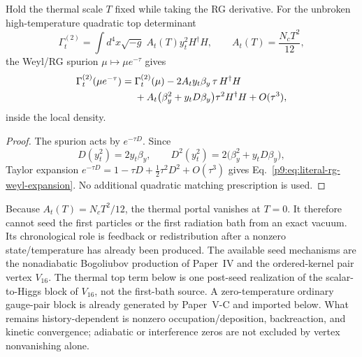 \documentclass[12pt,a4paper]{article}
\begin{document}
\begin{lemma}
\label{p9:lem:two-higgs-anomaly-matching}
Hold the thermal scale \(T\) fixed while taking the RG derivative.  For the
unbroken high-temperature quadratic top determinant
\begin{equation}
\label{p9:eq:top-thermal-det-quadratic}
\Gamma_t^{(2)}
=\int d^4x\sqrt{-g}\;A_t(T)y_t^2H^\dagger H,
\qquad A_t(T)=\frac{N_cT^2}{12},
\end{equation}
the Weyl/RG spurion \(\mu\mapsto\mu e^{-\tau}\) gives
\begin{align}
\Gamma_t^{(2)}(\mu e^{-\tau})
={}&\Gamma_t^{(2)}(\mu)
-2A_t y_t\beta_y\,\tau\,H^\dagger H \notag\\
&+A_t\bigl(\beta_y^2+y_tD\beta_y\bigr)\tau^2H^\dagger H
+O(\tau^3),
\label{p9:eq:literal-rg-weyl-expansion}
\end{align}
inside the local density.
\end{lemma}

\begin{proof}
The spurion acts by \(e^{-\tau D}\).  Since
\[
D(y_t^2)=2y_t\beta_y,
\qquad
D^2(y_t^2)=2\bigl(\beta_y^2+y_tD\beta_y\bigr),
\]
Taylor expansion
\(e^{-\tau D}=1-\tau D+\tfrac12\tau^2D^2+O(\tau^3)\)
gives Eq.~\eqref{p9:eq:literal-rg-weyl-expansion}.  No additional quadratic
matching prescription is used.
\end{proof}

\begin{remark}
\label{p9:rem:thermal-portal-chronology}
Because \(A_t(T)=N_cT^2/12\), the thermal portal vanishes at \(T=0\).  It
therefore cannot seed the first particles or the first radiation bath from an
exact vacuum.  Its chronological role is feedback or redistribution after a
nonzero state/temperature has already been produced.  The available seed
mechanisms are the nonadiabatic Bogoliubov production of Paper~IV and the
ordered-kernel pair vertex \(V_{16}\).  The thermal top term below is one
post-seed realization of the scalar-to-Higgs block of \(V_{16}\), not the
first-bath source.  A zero-temperature ordinary gauge-pair block is already generated by
Paper~V-C and imported below.  What remains history-dependent is nonzero
occupation/deposition, backreaction, and kinetic convergence; adiabatic or
interference zeros are not excluded by vertex nonvanishing alone.
\end{remark}
\end{document}
